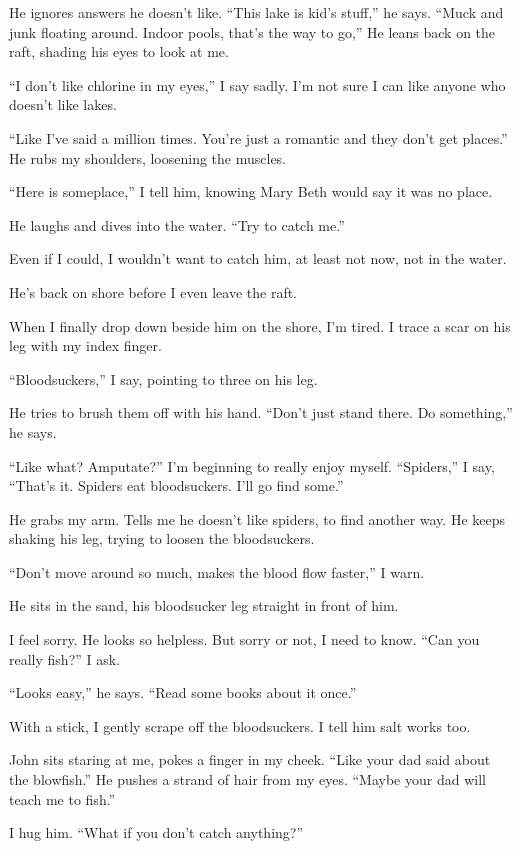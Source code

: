\documentclass[twoside,10pt]{book}
\begin{document}
He ignores answers he doesn't like. ``This lake is kid's stuff,'' he
says. ``Muck and junk floating around. Indoor pools, that's the way to
go,'' He leans back on the raft, shading his eyes to look at me.

``I don't like chlorine in my eyes,'' I say sadly. I'm not sure I can
like anyone who doesn't like lakes.

``Like I've said a million times. You're just a romantic and they don't
get places.'' He rubs my shoulders, loosening the muscles.

``Here is someplace,'' I tell him, knowing Mary Beth would say it was no
place.

He laughs and dives into the water. ``Try to catch me.''

Even if I could, I wouldn't want to catch him, at least not now, not in
the water.

He's back on shore before I even leave the raft.

When I finally drop down beside him on the shore, I'm tired. I trace a
scar on his leg with my index finger.

``Bloodsuckers,'' I say, pointing to three on his leg.

He tries to brush them off with his hand. ``Don't just stand there. Do
something,'' he says.

``Like what? Amputate?'' I'm beginning to really enjoy myself.
``Spiders,'' I say, ``That's it. Spiders eat bloodsuckers. I'll go find
some.''

He grabs my arm. Tells me he doesn't like spiders, to find another way.
He keeps shaking his leg, trying to loosen the bloodsuckers.

``Don't move around so much, makes the blood flow faster,'' I warn.

He sits in the sand, his bloodsucker leg straight in front of him.

I feel sorry. He looks so helpless. But sorry or not, I need to know.
``Can you really fish?'' I ask.

``Looks easy,'' he says. ``Read some books about it once.''

With a stick, I gently scrape off the bloodsuckers. I tell him salt
works too.

John sits staring at me, pokes a finger in my cheek. ``Like your dad
said about the blowfish.'' He pushes a strand of hair from my eyes.
``Maybe your dad will teach me to fish.''

I hug him. ``What if you don't catch anything?''
\end{document}
